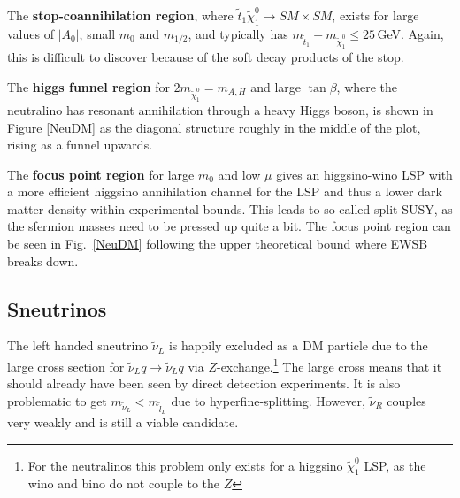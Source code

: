 \documentclass[notes.tex]{subfiles}
\begin{document}
The {\bf stop-coannihilation region}, where $\tilde{t}_1 \tilde{\chi}^0_1 \to SM\times SM$, exists for large values of $|A_0|$, small $m_0$ and  $m_{1/2}$, and typically has $m_{\tilde{t}_1} - m_{\tilde{\chi}^0_1}\leq 25$\,GeV. Again, this is difficult to discover because of the soft decay products of the stop.

The {\bf higgs funnel region} for $2 m_{\tilde{\chi}^0_1} = m_{A,H}$ and large $\tan \beta$, where the neutralino has resonant annihilation through a heavy Higgs boson, is shown in Figure \ref{NeuDM} as the diagonal structure roughly in the middle of the plot, rising as a funnel upwards.

The {\bf focus point region} for large $m_0$ and low $\mu$ gives an higgsino-wino LSP with a more efficient higgsino annihilation channel for the LSP and thus a lower dark matter density within experimental bounds. This leads to so-called split-SUSY, as the sfermion masses need to be pressed up quite a bit. The focus point region can be seen in Fig.~\ref{NeuDM} following the upper theoretical bound where EWSB breaks down.

\subsection{Sneutrinos}
The left handed sneutrino $\tilde{\nu}_L$ is happily excluded as a DM particle due to the large cross section for  $\tilde{\nu}_L q \to \tilde{\nu}_L q$ via $Z$-exchange.\footnote{For the neutralinos this problem only exists for a higgsino $\tilde{\chi}^0_1$ LSP, as the wino and bino  do not couple to the $Z$} The large cross means that it should already have been seen by direct detection experiments. It is also problematic to get $m_{\tilde{\nu}_L}<m_{\tilde{l}_L}$ due to hyperfine-splitting. However, $\tilde{\nu}_R$ couples very weakly and is still a viable candidate.

\end{document}
